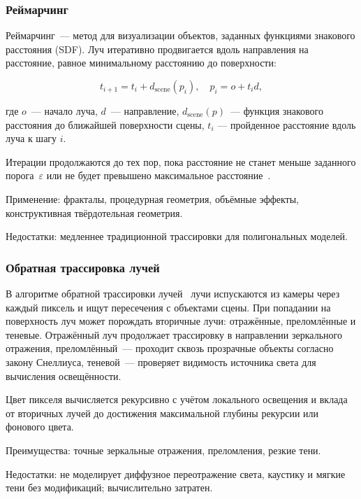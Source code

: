 \subsubsection{Реймарчинг}

Реймарчинг~--- метод для визуализации объектов, заданных функциями знакового расстояния (SDF).
Луч итеративно продвигается вдоль направления на расстояние, равное минимальному расстоянию до поверхности:

\begin{equation}
t_{i+1} = t_i + d_{\text{scene}}(p_i), \quad p_i = o + t_i d,
\end{equation}

\noindent где $o$~--- начало луча, $d$~--- направление, $d_{\text{scene}}(p)$~--- функция знакового расстояния до ближайшей поверхности сцены, $t_i$ --- пройденное расстояние вдоль луча к шагу $i$.

Итерации продолжаются до тех пор, пока расстояние не станет меньше заданного порога~$\varepsilon$ или не будет превышено максимальное расстояние~\cite{ray-marching}.

Применение: фракталы, процедурная геометрия, объёмные эффекты, конструктивная твёрдотельная геометрия.

Недостатки: медленнее традиционной трассировки для полигональных моделей.

\subsubsection{Обратная трассировка лучей}

В алгоритме обратной трассировки лучей~\cite{back-raytraicing} лучи испускаются из камеры через каждый пиксель и ищут пересечения с объектами сцены.
При попадании на поверхность луч может порождать вторичные лучи: отражённые, преломлённые и теневые.
Отражённый луч продолжает трассировку в направлении зеркального отражения, преломлённый~--- проходит сквозь прозрачные объекты согласно закону Снеллиуса,
теневой~--- проверяет видимость источника света для вычисления освещённости.

Цвет пикселя вычисляется рекурсивно с учётом локального освещения и вклада от вторичных лучей до достижения максимальной глубины рекурсии или фонового цвета.

Преимущества: точные зеркальные отражения, преломления, резкие тени.

Недостатки: не моделирует диффузное переотражение света, каустику и мягкие тени без модификаций; вычислительно затратен.


